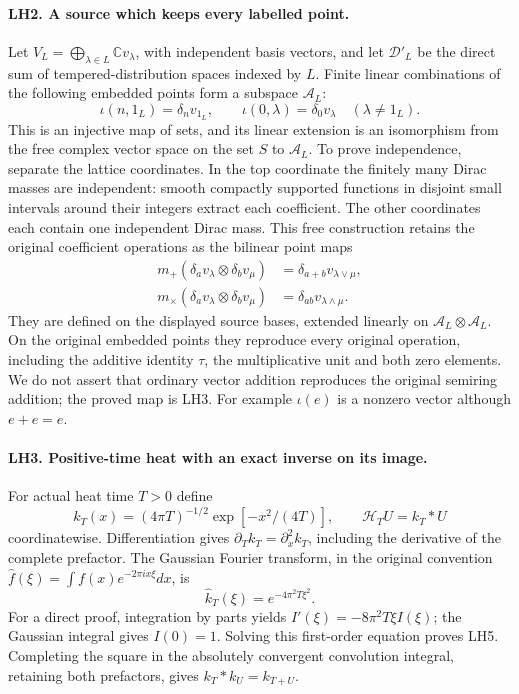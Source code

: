 \paragraph{LH2. A source which keeps every labelled point.}
Let \(V_L=\bigoplus_{\lambda\in L}\mathbb C v_\lambda\), with
independent basis vectors, and let \(\mathcal D'_L\) be the direct
sum of tempered-distribution spaces indexed by \(L\). Finite
linear combinations of the following embedded points form a
subspace \(\mathcal A_L\):
\[
 \iota(n,1_L)=\delta_n v_{1_L},\qquad
 \iota(0,\lambda)=\delta_0v_\lambda\quad(\lambda\ne1_L).
                                                               \tag{LH2}
\]
This is an injective map of sets, and its linear extension is an
isomorphism from the free complex vector space on the set \(S\)
to \(\mathcal A_L\). To prove independence, separate the lattice
coordinates. In the top coordinate the finitely many Dirac masses
are independent: smooth compactly supported functions in disjoint
small intervals around their integers extract each coefficient.
The other coordinates each contain one independent Dirac mass.
This free construction retains the original coefficient operations
as the bilinear point maps
\[
 \begin{split}
 m_+(\delta_a v_\lambda\otimes\delta_bv_\mu)
    &=\delta_{a+b}v_{\lambda\vee\mu},\\
 m_\times(\delta_a v_\lambda\otimes\delta_bv_\mu)
    &=\delta_{ab}v_{\lambda\wedge\mu}.
 \end{split}\tag{LH3}
\]
They are defined on the displayed source bases, extended linearly
on \(\mathcal A_L\otimes\mathcal A_L\). On the original embedded
points they reproduce every original operation, including the
additive identity \(\tau\), the multiplicative unit and both
zero elements. We do not assert that ordinary vector addition
reproduces the original semiring addition; the proved map is LH3.
For example \(\iota(e)\) is a nonzero vector although \(e+e=e\).

\paragraph{LH3. Positive-time heat with an exact inverse on its image.}
For actual heat time \(T>0\) define
\[
 k_T(x)=(4\pi T)^{-1/2}\exp[-x^2/(4T)],\qquad
 \mathcal H_T U=k_T*U                                      \tag{LH4}
\]
coordinatewise. Differentiation gives
\(\partial_Tk_T=\partial_x^2k_T\), including the derivative
of the complete prefactor. The Gaussian Fourier transform, in the
original convention \(\widehat f(\xi)=\int f(x)e^{-2\pi i x\xi}dx\),
is
\[
 \widehat k_T(\xi)=e^{-4\pi^2T\xi^2}.              \tag{LH5}
\]
For a direct proof, integration by parts yields
\(I'(\xi)=-8\pi^2T\xi I(\xi)\); the Gaussian integral gives
\(I(0)=1\). Solving this first-order equation proves LH5.
Completing the square in the absolutely convergent convolution
integral, retaining both prefactors, gives
\(k_T*k_U=k_{T+U}\).


